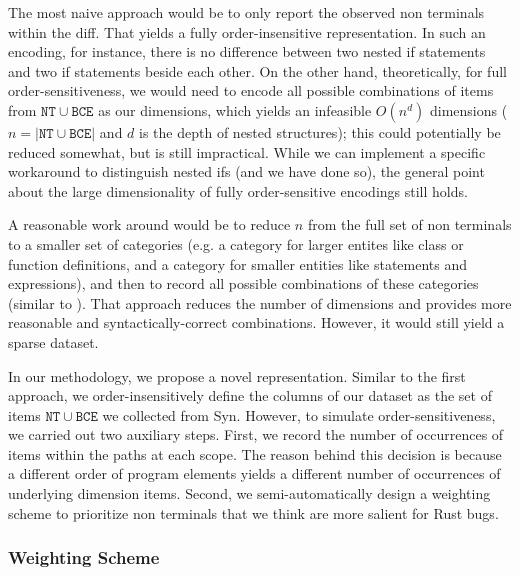 The most naive approach would be to only report the observed non terminals within the diff. That yields a fully order-insensitive representation. In such an encoding, for instance, there is no difference between two nested if statements and two if statements beside each other. On the other hand, theoretically, for full order-sensitiveness, we would need to encode all possible combinations of items from $\mathtt{NT} \cup \mathtt{BCE}$ as our dimensions, which yields an infeasible $O(n^d)$ dimensions ($n=|\mathtt{NT} \cup \mathtt{BCE}|$ and $d$ is the depth of nested structures); this could potentially be reduced somewhat, but is still impractical. While we can implement a specific workaround to distinguish nested ifs (and we have done so), the general point about the large dimensionality of fully order-sensitive encodings still holds.

A reasonable work around would be to reduce $n$ from the full set of non terminals to a smaller set of categories (e.g. a category for larger entites like class or function definitions, and a category for smaller entities like statements and expressions), and then to record all possible combinations of these categories (similar to \cite{hanam2016discovering}). That approach reduces the number of dimensions and provides more reasonable and syntactically-correct combinations. However, it would still yield a sparse dataset. 

In our methodology, we propose a novel representation. Similar to the first approach, we order-insensitively define the columns of our dataset as the set of items $\mathtt{NT} \cup \mathtt{BCE}$ we collected from Syn. However, to simulate order-sensitiveness, we carried out two auxiliary steps. First, we record the number of occurrences of items within the paths at each scope. The reason behind this decision is because a different order of program elements yields a different number of occurrences of underlying dimension items. Second, we semi-automatically design a weighting scheme to prioritize non terminals that we think are more salient for Rust bugs.

\subsubsection{\label{sec:weighting_scheme}Weighting Scheme}

